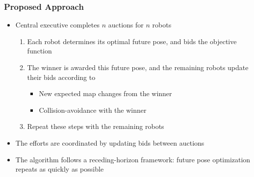 \documentclass[11pt,professionalfonts,hyperref={pdftex,pdfpagemode=none,pdfstartview=FitH}]{beamer}
\begin{document}
\begin{frame}
\frametitle{Proposed Approach}

\begin{itemize}
\item Central executive completes $n$ auctions for $n$ robots
\begin{enumerate}
	\item Each robot determines its optimal future pose, and bids the objective function
	\item The winner is awarded this future pose, and the remaining robots update their bids according to
	\begin{itemize}
		\item New expected map changes from the winner
		\item Collision-avoidance with the winner
	\end{itemize}
	\item Repeat these steps with the remaining robots
\end{enumerate}
\item The efforts are coordinated by updating bids between auctions
\item The algorithm follows a receding-horizon framework: future pose optimization repeats as quickly as possible
\end{itemize}
\end{frame}

%
%
%
%
\end{document}
